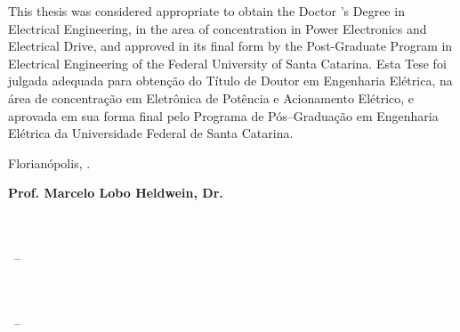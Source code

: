 


\begin{folhadeaprovacao}

    \begin{center}
        {\ABNTEXchapterfont\large\imprimirautor}

        \begin{center}
            \ABNTEXchapterfont\bfseries\Large\imprimirtitulo
        \end{center}

        \begin{minipage}{\textwidth}
            \chooselang
            {
                This thesis was considered appropriate to obtain the Doctor 's Degree in Electrical Engineering, in the area of concentration in Power Electronics and Electrical Drive, and approved in its final form by the Post-Graduate Program in Electrical Engineering of the Federal University of Santa Catarina.
            }
            {
                Esta Tese foi julgada adequada para obtenção do Título de Doutor em Engenharia Elétrica, na área de concentração em Eletrônica de Potência e Acionamento Elétrico, e aprovada em sua forma final pelo Programa de Pós--Graduação em Engenharia Elétrica da Universidade Federal de Santa Catarina.
            }
        \end{minipage}%

    \end{center}
    \begin{center}
        Florianópolis, \imprimirdata.
    \end{center}

    \assinatura
    {
        \textbf{Prof. Marcelo Lobo Heldwein, Dr.} \\
         \imprimirprograma
    }

    \assinatura
    {
        \textbf{\imprimirorientador} \\ \imprimirorientadorRotulo \\
        \imprimirinstituicao~--~\imprimirinstituicaosigla
    }

    \assinatura
    {
        \textbf{\imprimircoorientador} \\ \imprimircoorientadorRotulo \\
        \imprimirinstituicao~--~\imprimirinstituicaosigla
    }

    \newpage
    \begin{flushleft}
        \textbf{}
    \end{flushleft}


\end{folhadeaprovacao}
